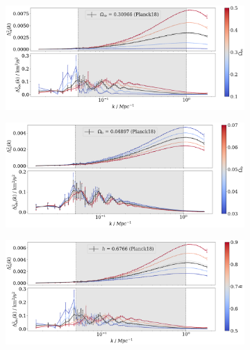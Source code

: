 \documentclass[floats,floatfix,showpacs,amssymb,prd,superscriptaddress,nofootinbib, 11pt]{revtex4-2} %
\begin{document}
\begin{figure}[H]
     \centering
     \begin{subfigure}[b]{0.9\textwidth}
         \centering
         \includegraphics[width=\textwidth]{images/ic_power_spectra/compare_cosmologies_averaged_power_spectra_Om.png}
     \end{subfigure}
     \hfill
     \begin{subfigure}[b]{0.9\textwidth}
         \centering
         \includegraphics[width=\textwidth]{images/ic_power_spectra/compare_cosmologies_averaged_power_spectra_Ob.png}
     \end{subfigure}
     \hfill
     \begin{subfigure}[b]{0.9\textwidth}
         \centering
         \includegraphics[width=\textwidth]{images/ic_power_spectra/compare_cosmologies_averaged_power_spectra_h.png}

\end{subfigure}
\end{figure}
\end{document}

